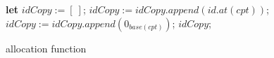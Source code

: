 \begin{algorithm}[h]
\begin{algorithmic}[1]
    \State

      \State \textbf{let} $idCopy := [\ ]$;
         
          \State $idCopy := idCopy.append(id.at(cpt))$;
          \Else {}
          \State $idCopy := idCopy.append(0_{base(cpt)})$; \label{line:base}
        \EndIf
      \EndFor
      \State \Return $idCopy$;
    \EndFunction

  \end{algorithmic}
\caption{\NAME{} allocation function}
\label{algo:hashstrategychoice}

\end{algorithm}
